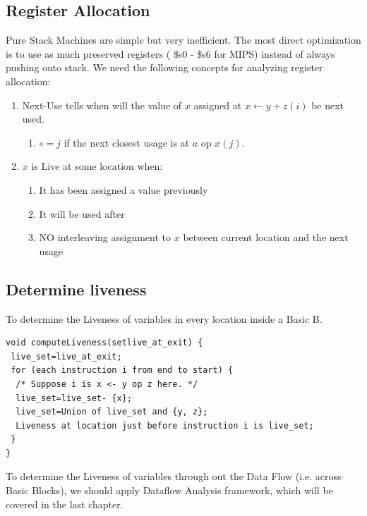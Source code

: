 \documentclass[a4paper]{exam}
\theoremstyle{definition}
\begin{document}
\subsection{Register Allocation}
Pure Stack Machines are simple but very inefficient. The most direct optimization is to use as much preserved registers ( \$s0 - \$s6 for MIPS) instead of always pushing onto stack. We need the following concepts for analyzing register allocation:

\begin{enumerate}
    \item  Next-Use tells when will the value of $x$ assigned at $x \leftarrow y+z(i)$ be next used.
    \begin{enumerate}
        \item $\circ=j$ if the next closest usage is at $a$ op $x(j)$.
    \end{enumerate}
\item $x$ is Live at some location when:
\begin{enumerate}
    \item  It has been assigned a value previously
\item It will be used after
\item NO interleaving assignment to $x$ between current location and the next usage
\end{enumerate}
\end{enumerate}
\subsection{Determine liveness}
To determine the Liveness of variables in every location inside a Basic B.
\begin{verbatim}
void computeLiveness(setlive_at_exit) {
 live_set=live_at_exit;
 for (each instruction i from end to start) {
  /* Suppose i is x <- y op z here. */
  live_set=live_set- {x};
  live_set=Union of live_set and {y, z};
  Liveness at location just before instruction i is live_set;  
 }
}
\end{verbatim}
To determine the Liveness of variables through out the Data Flow (i.e. across Basic Blocks), we should apply Dataflow Analysis framework, which will be covered in the last chapter.
\end{document}
